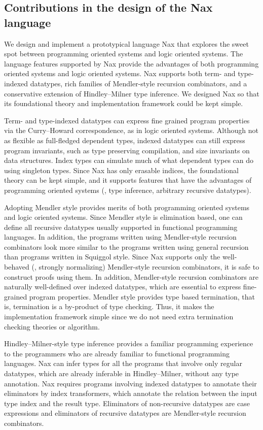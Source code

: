 \subsection{Contributions in the design of the Nax language}
We design and implement a prototypical language Nax that explores
the sweet spot between programming oriented systems and logic oriented systems.
The language features supported by Nax provide the advantages
of both programming oriented systems and logic oriented systems.
Nax supports both term- and type-indexed datatypes,
rich families of Mendler-style recursion combinators,
and a conservative extension of Hindley--Milner type inference.
We designed Nax so that its foundational theory and
implementation framework could be kept simple.

Term- and type-indexed datatypes can express fine grained program properties
via the Curry--Howard correspondence, as in logic oriented systems. Although
not as flexible as full-fledged dependent types, indexed datatypes can
still express program invariants, such as type preserving compilation,
and size invariants on data structures. Index types can simulate much of what
dependent types can do using singleton types. Since Nax has only erasable
indices, the foundational theory can be kept simple, and it supports
features that have the advantages of programming oriented systems 
(\eg, type inference, arbitrary recursive datatypes).

Adopting Mendler style provides merits of both programming oriented systems
and logic oriented systems. Since Mendler style is elimination based, one can
define all recursive datatypes usually supported in functional programming
languages. In addition, the programs written using Mendler-style recursion
combinators look more similar to the programs written using general recursion
than programs written in Squiggol style.
Since Nax supports only the well-behaved (\ie, strongly normalizing)
Mendler-style recursion combinators, it is safe to construct proofs using them.
In addition, Mendler-style recursion combinators are naturally well-defined
over indexed datatypes, which are essential to express fine-grained program
properties. Mendler style provides type based termination, that is, termination
is a by-product of type checking. Thus, it makes the implementation framework
simple since we do not need extra termination checking theories or algorithm.

Hindley--Milner-style type inference provides a familiar programming experience
to the programmers who are already familiar to functional programming languages.
Nax can infer types for all the programs that involve only regular datatypes,
which are already inferable in Hindley--Milner, without any type annotation.
Nax requires programs involving indexed datatypes to annotate their eliminators
by index transformers, which annotate the relation between the input type index
and the result type. Eliminators of non-recursive datatypes are case expressions
and eliminators of recursive datatypes are Mendler-style recursion combinators.

